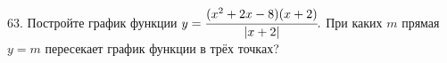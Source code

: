 63. Постройте график функции $y=\cfrac{(x^2+2x-8)(x+2)}{|x+2|}.$ При каких $m$ прямая $y=m$ пересекает график функции в трёх точках?\\
